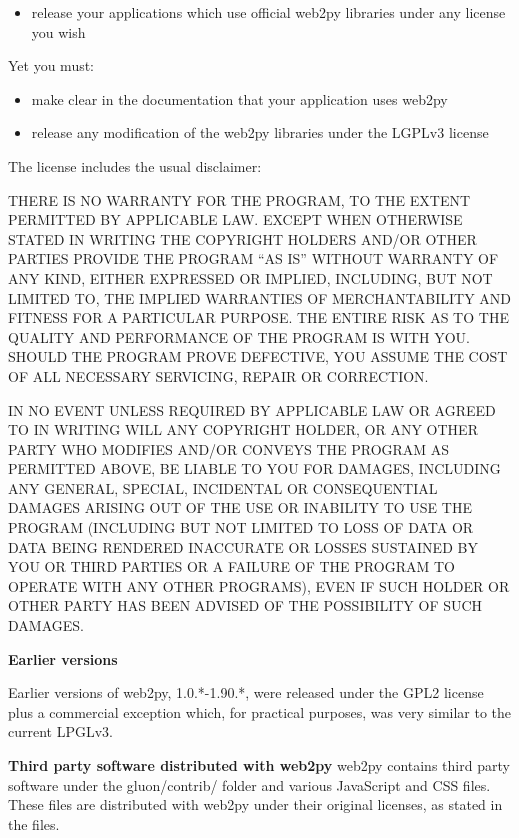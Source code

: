 \documentclass[justified,sixbynine,notoc]{tufte-book}
\begin{document}
\begin{fullwidth}
\begin{itemize}
\item release your applications which use official web2py libraries under any license you wish
\end{itemize}

Yet you must:

\begin{itemize}
\item make clear in the documentation that your application uses web2py

\item release any modification of the web2py libraries under the LGPLv3 license
\end{itemize}

The license includes the usual disclaimer:

THERE IS NO WARRANTY FOR THE PROGRAM, TO THE EXTENT PERMITTED BY APPLICABLE LAW.
EXCEPT WHEN OTHERWISE STATED IN WRITING THE COPYRIGHT HOLDERS AND/OR OTHER PARTIES
PROVIDE THE PROGRAM “AS IS” WITHOUT WARRANTY OF ANY KIND, EITHER EXPRESSED OR IMPLIED,
INCLUDING, BUT NOT LIMITED TO, THE IMPLIED WARRANTIES OF MERCHANTABILITY AND FITNESS
FOR A PARTICULAR PURPOSE. THE ENTIRE RISK AS TO THE QUALITY AND PERFORMANCE OF THE
PROGRAM IS WITH YOU. SHOULD THE PROGRAM PROVE DEFECTIVE, YOU ASSUME THE COST OF ALL
NECESSARY SERVICING, REPAIR OR CORRECTION.

IN NO EVENT UNLESS REQUIRED BY APPLICABLE LAW OR AGREED TO IN WRITING WILL ANY COPYRIGHT
HOLDER, OR ANY OTHER PARTY WHO MODIFIES AND/OR CONVEYS THE PROGRAM AS PERMITTED ABOVE,
BE LIABLE TO YOU FOR DAMAGES, INCLUDING ANY GENERAL, SPECIAL, INCIDENTAL OR CONSEQUENTIAL
DAMAGES ARISING OUT OF THE USE OR INABILITY TO USE THE PROGRAM (INCLUDING BUT NOT LIMITED
TO LOSS OF DATA OR DATA BEING RENDERED INACCURATE OR LOSSES SUSTAINED BY YOU OR THIRD PARTIES
OR A FAILURE OF THE PROGRAM TO OPERATE WITH ANY OTHER PROGRAMS), EVEN IF SUCH HOLDER OR OTHER
PARTY HAS BEEN ADVISED OF THE POSSIBILITY OF SUCH DAMAGES.

{\bf Earlier versions}

Earlier versions of web2py, 1.0.*-1.90.*, were released under the GPL2 license plus a
commercial exception which, for practical purposes, was very similar to the current LPGLv3.

{\bf Third party software distributed with web2py}
\noindent web2py contains third party software under the gluon/contrib/ folder and various JavaScript and CSS files.
These files are distributed with web2py under their original licenses, as stated in the files.


\end{fullwidth}
\end{document}
